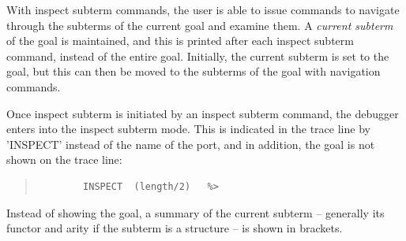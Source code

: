 With inspect subterm commands, the user is able to issue commands to
navigate through the subterms of the current goal and examine them. 
A {\it current subterm} of the goal is maintained, and this is
printed after each inspect subterm command, instead of the entire goal. 
Initially, the current subterm is set to the goal, but this can then be
moved to the subterms of the goal with navigation commands.

Once inspect subterm is initiated by an inspect subterm command, the
debugger enters into the inspect subterm mode. This is indicated in the
trace line by 'INSPECT' instead of the name of the port, and in addition,
the goal is not shown on the trace line:

\begin{quote}\begin{verbatim}
        INSPECT  (length/2)   %> 
\end{verbatim}\end{quote}

Instead of showing the goal, a summary of the current subterm -- generally its
functor and arity if the subterm is a structure -- is shown in brackets. 

